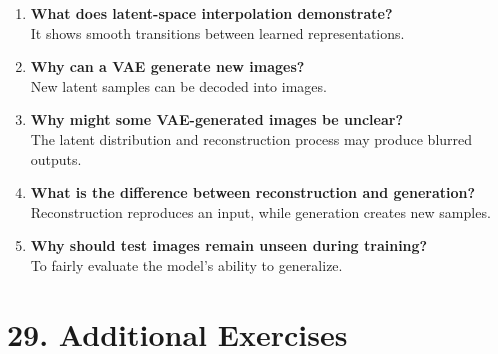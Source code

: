 \documentclass[10pt]{article}
\begin{document}
\begin{enumerate}
\item \textbf{What does latent-space interpolation demonstrate?}\\
It shows smooth transitions between learned representations.

\item \textbf{Why can a VAE generate new images?}\\
New latent samples can be decoded into images.

\item \textbf{Why might some VAE-generated images be unclear?}\\
The latent distribution and reconstruction process may produce blurred outputs.

\item \textbf{What is the difference between reconstruction and generation?}\\
Reconstruction reproduces an input, while generation creates new samples.

\item \textbf{Why should test images remain unseen during training?}\\
To fairly evaluate the model's ability to generalize.

\end{enumerate}


\section*{29. Additional Exercises}
\end{document}
